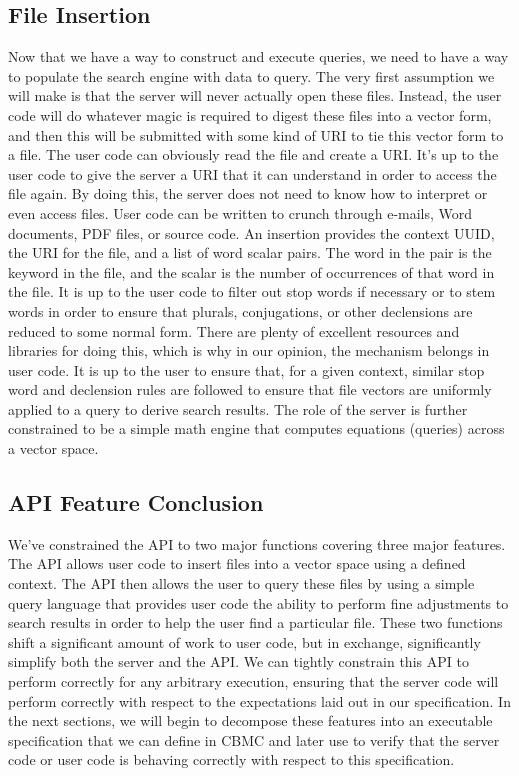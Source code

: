 \subsection{File Insertion}

Now that we have a way to construct and execute queries, we need to have a way
to populate the search engine with data to query.  The very first assumption we
will make is that the server will never actually open these files.  Instead, the
user code will do whatever magic is required to digest these files into a vector
form, and then this will be submitted with some kind of URI to tie this vector
form to a file.  The user code can obviously read the file and create a URI.
It's up to the user code to give the server a URI that it can understand in
order to access the file again.  By doing this, the server does not need to know
how to interpret or even access files.  User code can be written to crunch
through e-mails, Word documents, PDF files, or source code.  An insertion
provides the context UUID, the URI for the file, and a list of word scalar
pairs. The word in the pair is the keyword in the file, and the scalar is the
number of occurrences of that word in the file.  It is up to the user code to
filter out stop words if necessary or to stem words in order to ensure that
plurals, conjugations, or other declensions are reduced to some normal form.
There are plenty of excellent resources and libraries for doing this, which is
why in our opinion, the mechanism belongs in user code.  It is up to the user to
ensure that, for a given context, similar stop word and declension rules are
followed to ensure that file vectors are uniformly applied to a query to derive
search results. The role of the server is further constrained to be a simple
math engine that computes equations (queries) across a vector space.

\subsection{API Feature Conclusion}

We've constrained the API to two major functions covering three major features.
The API allows user code to insert files into a vector space using a defined
context.  The API then allows the user to query these files by using a simple
query language that provides user code the ability to perform fine adjustments
to search results in order to help the user find a particular file.  These two
functions shift a significant amount of work to user code, but in exchange,
significantly simplify both the server and the API. We can tightly constrain
this API to perform correctly for any arbitrary execution, ensuring that the
server code will perform correctly with respect to the expectations laid out in
our specification. In the next sections, we will begin to decompose these
features into an executable specification that we can define in CBMC and later
use to verify that the server code or user code is behaving correctly with
respect to this specification.
